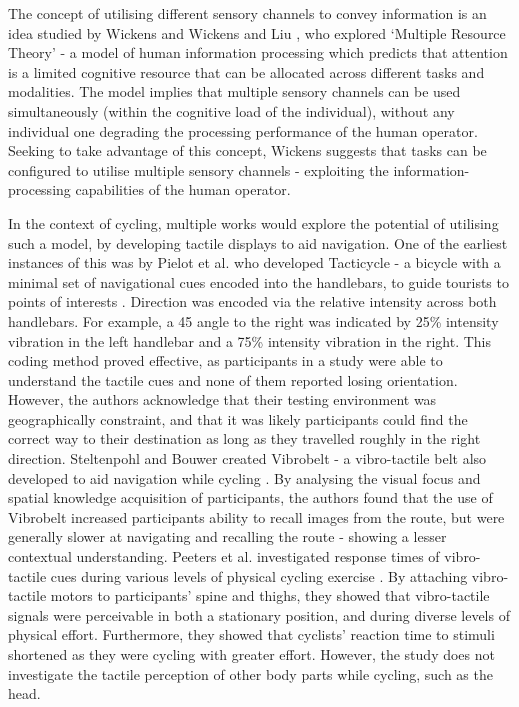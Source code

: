 \documentclass{interim}
\begin{document}
The concept of utilising different sensory channels to convey information is an idea studied by Wickens \cite{wickens1984processing} and Wickens and Liu \cite{doi:10.1177/001872088803000505}, who explored ‘Multiple Resource Theory’ - a model of human information processing which predicts that attention is a limited cognitive resource that can be allocated across different tasks and modalities. The model implies that multiple sensory channels can be used simultaneously (within the cognitive load of the individual), without any individual one degrading the processing performance of the human operator. Seeking to take advantage of this concept, Wickens suggests that tasks can be configured to utilise multiple sensory channels - exploiting the information-processing capabilities of the human operator.

In the context of cycling, multiple works would explore the potential of utilising such a model, by developing tactile displays to aid navigation. One of the earliest instances of this was by Pielot et al. who developed Tacticycle - a bicycle with a minimal set of navigational cues encoded into the handlebars, to guide tourists to points of interests \cite{10.1145/2371574.2371631}. Direction was encoded via the relative intensity across both handlebars. For example, a 45\degree{} angle to the right was indicated by 25\% intensity vibration in the left handlebar and a 75\% intensity vibration in the right. This coding method proved effective, as participants in a study were able to understand the tactile cues and none of them reported losing orientation. However, the authors acknowledge that their testing environment was geographically constraint, and that it was likely participants could find the correct way to their destination as long as they travelled roughly in the right direction. Steltenpohl and Bouwer created Vibrobelt - a vibro-tactile belt also developed to aid navigation while cycling \cite{10.1145/2449396.2449450}. By analysing the visual focus and spatial knowledge acquisition of participants, the authors found that the use of Vibrobelt increased participants ability to recall images from the route, but were generally slower at navigating and recalling the route - showing a lesser contextual understanding. Peeters et al. investigated response times of vibro-tactile cues during various levels of physical cycling exercise \cite{peeters2019vibrotactile}. By attaching vibro-tactile motors to participants' spine and thighs, they showed that vibro-tactile signals were perceivable in both a stationary position, and during diverse levels of physical effort. Furthermore, they showed that cyclists' reaction time to stimuli shortened as they were cycling with greater effort. However, the study does not investigate the tactile perception of other body parts while cycling, such as the head.
\end{document}
